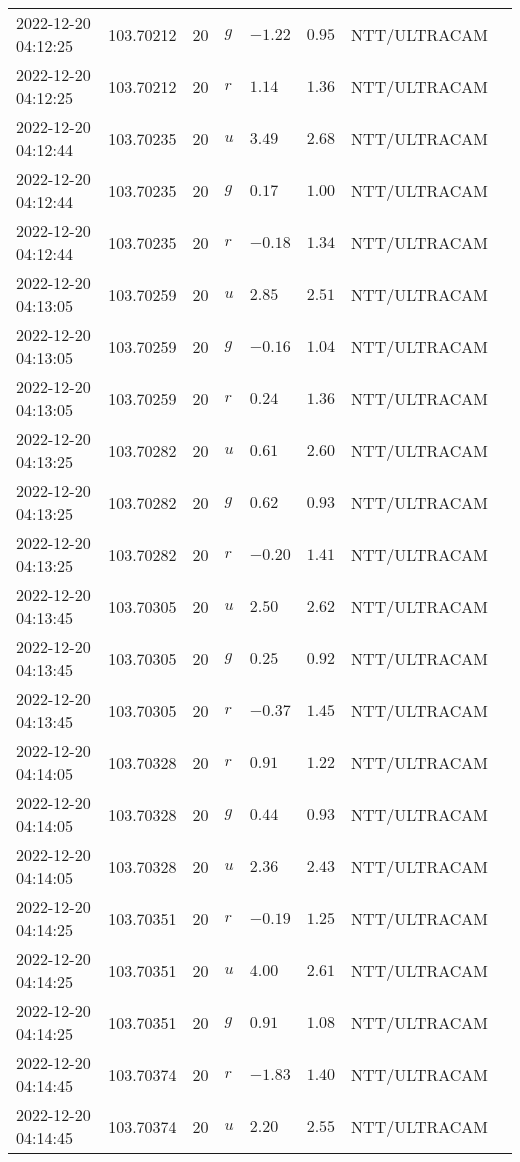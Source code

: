 \documentclass{nature_plusfigure}
\begin{document}
\begin{supplement}
\begin{center}
\begin{longtable}{llllllll}
2022-12-20 04:12:25 & 103.70212 & 20 & $g$ & $-1.22$ & $0.95$ & NTT/ULTRACAM &  \\ 
2022-12-20 04:12:25 & 103.70212 & 20 & $r$ & $1.14$ & $1.36$ & NTT/ULTRACAM &  \\ 
2022-12-20 04:12:44 & 103.70235 & 20 & $u$ & $3.49$ & $2.68$ & NTT/ULTRACAM &  \\ 
2022-12-20 04:12:44 & 103.70235 & 20 & $g$ & $0.17$ & $1.00$ & NTT/ULTRACAM &  \\ 
2022-12-20 04:12:44 & 103.70235 & 20 & $r$ & $-0.18$ & $1.34$ & NTT/ULTRACAM &  \\ 
2022-12-20 04:13:05 & 103.70259 & 20 & $u$ & $2.85$ & $2.51$ & NTT/ULTRACAM &  \\ 
2022-12-20 04:13:05 & 103.70259 & 20 & $g$ & $-0.16$ & $1.04$ & NTT/ULTRACAM &  \\ 
2022-12-20 04:13:05 & 103.70259 & 20 & $r$ & $0.24$ & $1.36$ & NTT/ULTRACAM &  \\ 
2022-12-20 04:13:25 & 103.70282 & 20 & $u$ & $0.61$ & $2.60$ & NTT/ULTRACAM &  \\ 
2022-12-20 04:13:25 & 103.70282 & 20 & $g$ & $0.62$ & $0.93$ & NTT/ULTRACAM &  \\ 
2022-12-20 04:13:25 & 103.70282 & 20 & $r$ & $-0.20$ & $1.41$ & NTT/ULTRACAM &  \\ 
2022-12-20 04:13:45 & 103.70305 & 20 & $u$ & $2.50$ & $2.62$ & NTT/ULTRACAM &  \\ 
2022-12-20 04:13:45 & 103.70305 & 20 & $g$ & $0.25$ & $0.92$ & NTT/ULTRACAM &  \\ 
2022-12-20 04:13:45 & 103.70305 & 20 & $r$ & $-0.37$ & $1.45$ & NTT/ULTRACAM &  \\ 
2022-12-20 04:14:05 & 103.70328 & 20 & $r$ & $0.91$ & $1.22$ & NTT/ULTRACAM &  \\ 
2022-12-20 04:14:05 & 103.70328 & 20 & $g$ & $0.44$ & $0.93$ & NTT/ULTRACAM &  \\ 
2022-12-20 04:14:05 & 103.70328 & 20 & $u$ & $2.36$ & $2.43$ & NTT/ULTRACAM &  \\ 
2022-12-20 04:14:25 & 103.70351 & 20 & $r$ & $-0.19$ & $1.25$ & NTT/ULTRACAM &  \\ 
2022-12-20 04:14:25 & 103.70351 & 20 & $u$ & $4.00$ & $2.61$ & NTT/ULTRACAM &  \\ 
2022-12-20 04:14:25 & 103.70351 & 20 & $g$ & $0.91$ & $1.08$ & NTT/ULTRACAM &  \\ 
2022-12-20 04:14:45 & 103.70374 & 20 & $r$ & $-1.83$ & $1.40$ & NTT/ULTRACAM &  \\ 
2022-12-20 04:14:45 & 103.70374 & 20 & $u$ & $2.20$ & $2.55$ & NTT/ULTRACAM &  \\ 

\end{longtable}
\end{center}
\end{supplement}
\end{document}
